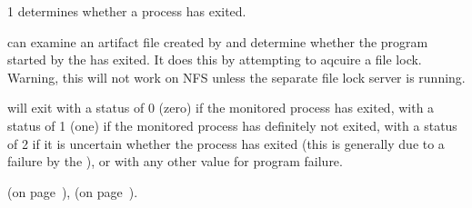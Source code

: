 \begin{ManPage}{\label{man-flock-undertaker}}{1}
{determines whether a process has exited.}

\Synopsis {}


\Description
{} can examine an artifact file created by
 and determine whether the program started by
the  has exited.  It does this by attempting to aqcuire
a file lock.  Warning, this will not work on NFS unless the separate
file lock server is running.

\begin{Options}
\end{Options}

\ExitStatus 
{} will exit with a status of 0 (zero) if the
monitored process has exited, with a status of 1 (one) if the
monitored process has definitely not exited, with a status of 2 if it
is uncertain whether the process has exited (this is generally due to
a failure by the ), or with any other value
for program failure.

\SeeAlso
{} (on page~\pageref{man-uniq-pid-undertaker}),
 (on page~\pageref{man-flock-midwife}).

\end{ManPage}
